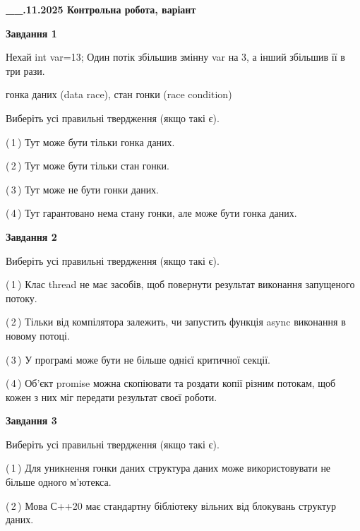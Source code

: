 \documentclass[12pt, ukrainian]{article}
\begin{document}
\begin {large}

\textbf{\_\_.11.2025 Контрольна робота, варіант  }\par


{

\begin{center}
\textbf{Завдання 1}
\end{center}
Нехай int var=13; Один потік збільшив змінну var на 3, а інший збільшив її в три рази.

гонка даних (data race), стан гонки (race condition)

Виберіть усі правильні твердження (якщо такі є).\par
\vspace{2mm}
(\,1\,) Тут може бути тільки гонка даних.%

(\,2\,) Тут може бути тільки стан гонки.%

(\,3\,) Тут може не бути гонки даних.%

(\,4\,) Тут гарантовано нема стану гонки, але може бути гонка даних.%



\begin{center}
\textbf{Завдання 2}
\end{center}
Виберіть усі правильні твердження (якщо такі є).\par
\vspace{2mm}

(\,1\,) Клас thread не має засобів, щоб повернути результат виконання запущеного потоку.%

(\,2\,) Тільки від компілятора залежить, чи запустить функція async виконання в новому потоці.%

(\,3\,) У програмі може бути не більше однієї критичної секції.%

(\,4\,) Об’єкт promise можна скопіювати та роздати копії різним потокам, щоб кожен з них міг передати результат своєї роботи.%



\begin{center}
\textbf{Завдання 3}
\end{center}
Виберіть усі правильні твердження (якщо такі є).\par
\vspace{2mm}

(\,1\,) Для уникнення гонки даних структура даних може використовувати не більше одного м’ютекса.%

(\,2\,) Мова С++20 має стандартну бібліотеку вільних від блокувань структур даних.%

}
\end{large}
\end{document}
